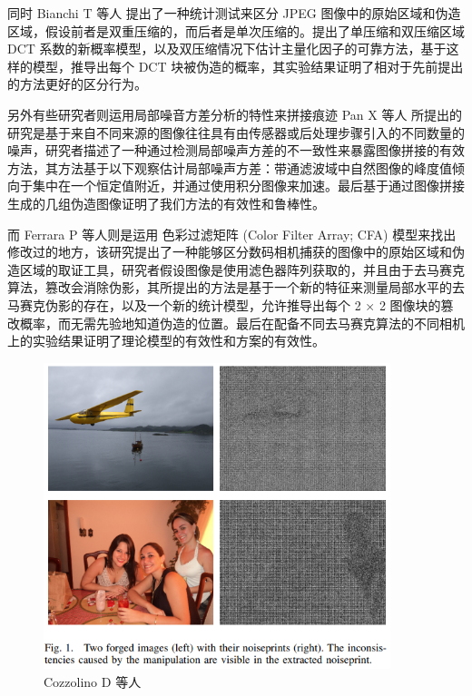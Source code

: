 同时 Bianchi T 等人 \cite{bianchi2011improved} 提出了一种统计测试来区分 JPEG 图像中的原始区域和伪造区域，假设前者是双重压缩的，而后者是单次压缩的。提出了单压缩和双压缩区域 DCT 系数的新概率模型，以及双压缩情况下估计主量化因子的可靠方法，基于这样的模型，推导出每个 DCT 块被伪造的概率，其实验结果证明了相对于先前提出的方法更好的区分行为。

另外有些研究者则运用局部噪音方差分析的特性来拼接痕迹 Pan X 等人 \cite{pan2012exposing} 所提出的研究是基于来自不同来源的图像往往具有由传感器或后处理步骤引入的不同数量的噪声，研究者描述了一种通过检测局部噪声方差的不一致性来暴露图像拼接的有效方法，其方法基于以下观察估计局部噪声方差：带通滤波域中自然图像的峰度值倾向于集中在一个恒定值附近，并通过使用积分图像来加速。最后基于通过图像拼接生成的几组伪造图像证明了我们方法的有效性和鲁棒性。

而 Ferrara P \cite{6210378} 等人则是运用 色彩过滤矩阵 (Color Filter Array; CFA) 模型来找出修改过的地方，该研究提出了一种能够区分数码相机捕获的图像中的原始区域和伪造区域的取证工具，研究者假设图像是使用滤色器阵列获取的，并且由于去马赛克算法，篡改会消除伪影，其所提出的方法是基于一个新的特征来测量局部水平的去马赛克伪影的存在，以及一个新的统计模型，允许推导出每个 2 × 2 图像块的篡改概率，而无需先验地知道伪造的位置。最后在配备不同去马赛克算法的不同相机上的实验结果证明了理论模型的有效性和方案的有效性。

\begin{figure}[htb]
\centering 
\includegraphics[width=0.90\textwidth]{img/ch3m5.png} 
\caption{Cozzolino D 等人 \cite{cozzolino2019noiseprint}}
\label{Test}
\end{figure}

